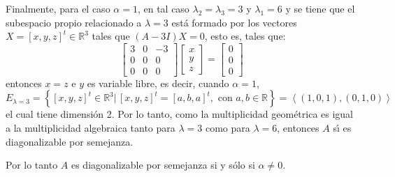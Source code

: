 \begin{solucion}
\begin{enumerate}[$a$)]
  \par
  Finalmente, para el caso $\alpha=1$, en tal caso $\lambda_2 = \lambda_3 = 3$ y $\lambda_1 = 6$ y se tiene que el subespacio propio relacionado a $\lambda = 3$ est\'a formado por los vectores $X = [x,y,z]^t \in\mathbb{R}^3$ tales que $(A-3I)X = 0$, esto es, tales que:
  \begin{equation*}
   \begin{bmatrix}
    3 & 0 & -3 \\
    0 & 0 &  0 \\
    0 & 0 &  0
   \end{bmatrix}
   \begin{bmatrix}
    x \\ y \\ z
   \end{bmatrix}
   =
   \begin{bmatrix}
    0 \\ 0 \\ 0
   \end{bmatrix}
  \end{equation*}
  entonces $x = z$ e $y$ es variable libre, es decir, cuando $\alpha = 1$,
  \begin{equation*}
   E_{\lambda= 3} = \left\{ [x,y,z]^t \in\mathbb{R}^3 |\, [x,y,z]^t = [a,b,a]^t, \text{ con } a,b\in\mathbb{R} \right\} = \left< (1,0,1), (0,1,0) \right>
  \end{equation*}
  el cual tiene dimensi\'on 2. Por lo tanto, como la multiplicidad geom\'etrica es igual a la multiplicidad algebraica tanto para $\lambda = 3$ como para $\lambda = 6$, entonces $A$ s\'{\i} es diagonalizable por semejanza.
  \par 
  Por lo tanto $A$ es diagonalizable por semejanza si y s\'olo si $\alpha \neq 0$.
  

\end{enumerate}
\end{solucion}
